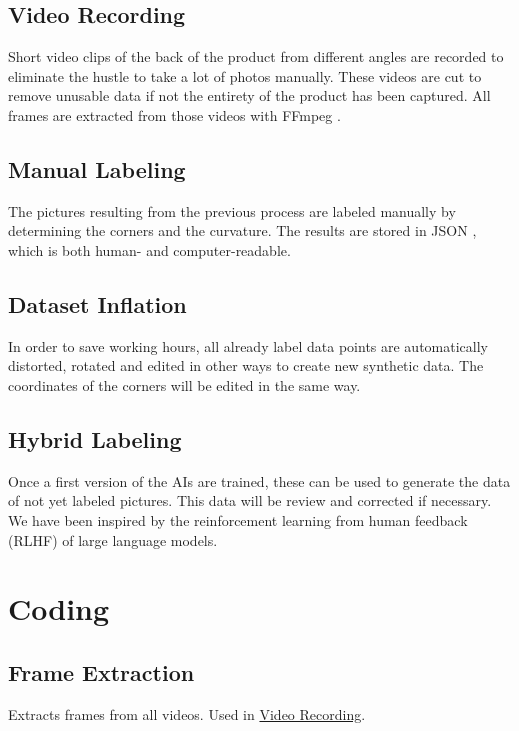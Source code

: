 \documentclass[a4paper,11pt]{report}
\begin{document}
            \subsection{Video Recording}
                \label{subsec:data:recording}
                Short video clips of the back of the product from different angles are recorded to eliminate the hustle to take a lot of photos manually. These videos are cut to remove unusable data if not the entirety of the product has been captured. All frames are extracted from those videos with FFmpeg \cite{ffmpeg} \cite{ffmpeg-python}.

            \subsection{Manual Labeling}
                The pictures resulting from the previous process are labeled manually by determining the corners and the curvature. The results are stored in JSON \cite{json}, which is both human- and computer-readable.

            \subsection{Dataset Inflation}
                \label{subsec:data:inflation}
                In order to save working hours, all already label data points are automatically distorted, rotated and edited in other ways to create new synthetic data. The coordinates of the corners will be edited in the same way.

            \subsection{Hybrid Labeling}
                Once a first version of the AIs are trained, these can be used to generate the data of not yet labeled pictures. This data will be review and corrected if necessary. We have been inspired by the reinforcement learning from human feedback (RLHF) \cite{rlhf1} \cite{rlhf2}  of large language models.

        \section{Coding}

            \subsection{Frame Extraction}
                Extracts frames from all videos. Used in \hyperref[subsec:data:recording]{Video Recording}.
\end{document}
